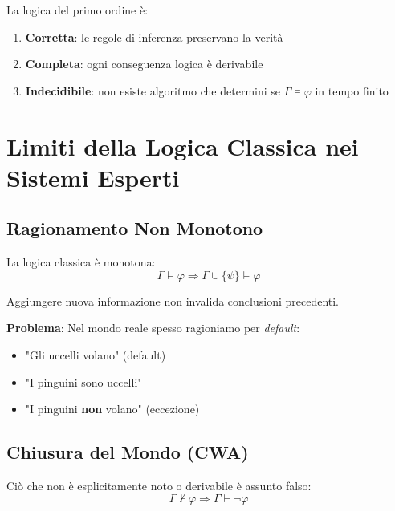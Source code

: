 \begin{teorema}
La logica del primo ordine è:
\begin{enumerate}
\item \textbf{Corretta}: le regole di inferenza preservano la verità
\item \textbf{Completa}: ogni conseguenza logica è derivabile
\item \textbf{Indecidibile}: non esiste algoritmo che determini se $\Gamma \models \varphi$ in tempo finito
\end{enumerate}
\end{teorema}

\section{Limiti della Logica Classica nei Sistemi Esperti}

\subsection{Ragionamento Non Monotono}

La logica classica è monotona:
\begin{equation}
\Gamma \models \varphi \Rightarrow \Gamma \cup \{\psi\} \models \varphi
\end{equation}

Aggiungere nuova informazione non invalida conclusioni precedenti.

\textbf{Problema}: Nel mondo reale spesso ragioniamo per \textit{default}:
\begin{itemize}
\item "Gli uccelli volano" (default)
\item "I pinguini sono uccelli"
\item "I pinguini \textbf{non} volano" (eccezione)
\end{itemize}

\subsection{Chiusura del Mondo (CWA)}

\begin{definizione}
Ciò che non è esplicitamente noto o derivabile è assunto falso:
\begin{equation}
\Gamma \not\vdash \varphi \Rightarrow \Gamma \vdash \neg \varphi
\end{equation}
\end{definizione}

